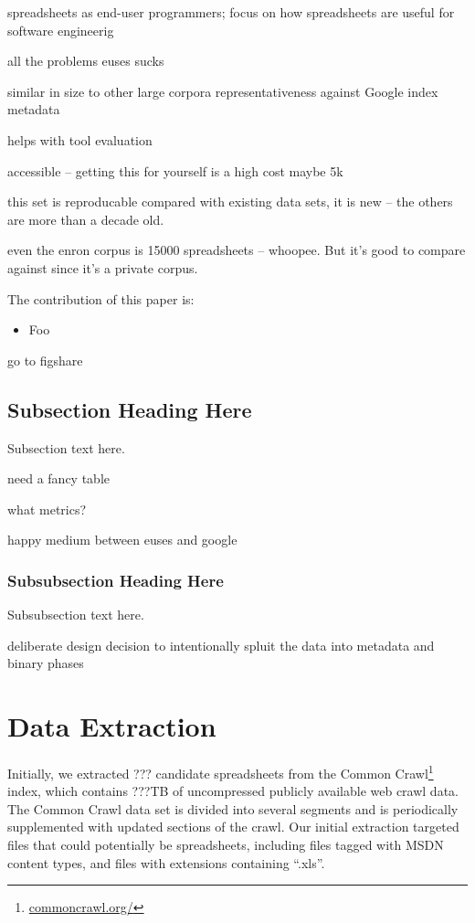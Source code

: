 \documentclass[conference]{IEEEtran}
\begin{document}
spreadsheets as end-user programmers; focus on how spreadsheets are useful for software engineerig


all the problems
euses sucks~~\cite{Fisher2005}

similar in size to other large corpora
representativeness against Google index
metadata

helps with tool evaluation

accessible -- getting this for yourself is a high cost maybe 5k

this set is reproducable
compared with existing data sets, it is new -- the others are more than a decade old.

even the enron corpus is 15000 spreadsheets -- whoopee. But it's good to compare against since it's a private corpus.

The contribution of this paper is:

\begin{itemize}
\item Foo
\end{itemize}

go to figshare

\subsection{Subsection Heading Here}
Subsection text here.

need a fancy table

what metrics?

happy medium between euses and google

\subsubsection{Subsubsection Heading Here}
Subsubsection text here.

deliberate design decision to 
intentionally spluit the data into metadata and binary phases

\section{Data Extraction}
Initially, we extracted ??? candidate spreadsheets from the Common Crawl\footnote{\url{commoncrawl.org/}} index, which contains ???TB of uncompressed publicly available web crawl data. 
The Common Crawl data set is divided into several segments and is periodically supplemented with updated sections of the crawl. 
Our initial extraction targeted files that could potentially be spreadsheets, including files tagged with MSDN content types, and files with extensions containing ``.xls''.
\end{document}
